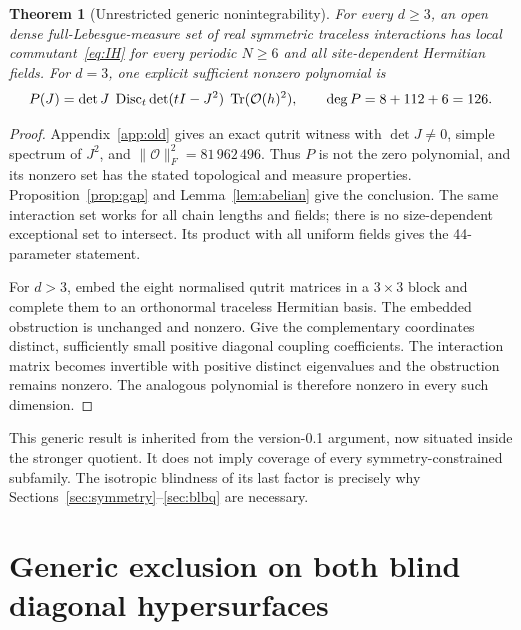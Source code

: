 \documentclass[11pt,a4paper]{article}
\numberwithin{equation}{section}
\newtheorem{theorem}{Theorem}[section]
\theoremstyle{definition}\newtheorem{definition}[theorem]{Definition}
\theoremstyle{remark}\newtheorem{remark}[theorem]{Remark}
\DeclareMathOperator{\Tr}{Tr}\DeclareMathOperator{\rank}{rank}
\newcommand{\Ob}{\mathcal O}\newcommand{\tens}{\otimes}
\begin{document}
\begin{theorem}[Unrestricted generic nonintegrability]\label{thm:generic}
For every $d\ge3$, an open dense full-Lebesgue-measure set of real symmetric traceless interactions has local commutant~\eqref{eq:IH} for every periodic $N\ge6$ and all site-dependent Hermitian fields. For $d=3$, one explicit sufficient nonzero polynomial is
\begin{equation}\label{eq:poly}
 P(J)=\det J\;\Disc_t\det(tI-J^2)\;\Tr(\Ob(h)^2),
 \qquad \deg P=8+112+6=126.
\end{equation}
\end{theorem}
\begin{proof}
Appendix~\ref{app:old} gives an exact qutrit witness with $\det J\ne0$, simple spectrum of $J^2$, and $\|\Ob\|_F^2=81\,962\,496$. Thus $P$ is not the zero polynomial, and its nonzero set has the stated topological and measure properties. Proposition~\ref{prop:gap} and Lemma~\ref{lem:abelian} give the conclusion. The same interaction set works for all chain lengths and fields; there is no size-dependent exceptional set to intersect. Its product with all uniform fields gives the 44-parameter statement.

For $d>3$, embed the eight normalised qutrit matrices in a $3\times3$ block and complete them to an orthonormal traceless Hermitian basis. The embedded obstruction is unchanged and nonzero. Give the complementary coordinates distinct, sufficiently small positive diagonal coupling coefficients. The interaction matrix becomes invertible with positive distinct eigenvalues and the obstruction remains nonzero. The analogous polynomial is therefore nonzero in every such dimension.
\end{proof}

This generic result is inherited from the version-0.1 argument, now situated inside the stronger quotient. It does not imply coverage of every symmetry-constrained subfamily. The isotropic blindness of its last factor is precisely why Sections~\ref{sec:symmetry}--\ref{sec:blbq} are necessary.

\section{Generic exclusion on both blind diagonal hypersurfaces}\label{sec:hypersurfaces}
\end{document}
